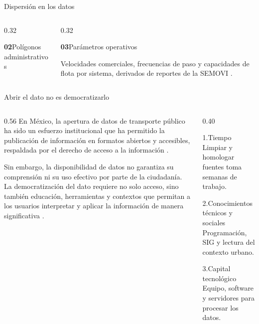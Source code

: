 \begin{frame}[t]{Dispersión en los datos}
\begin{columns}[T]
\begin{column}{0.32\textwidth}
\begin{block}{\parbox[c][1.4em][c]{\linewidth}{\small\textbf{02}\enspace Polígonos administrativos}}
      \end{block}
    \end{column}
    \begin{column}{0.32\textwidth}
      \begin{block}{\parbox[c][1.4em][c]{\linewidth}{\small\textbf{03}\enspace Parámetros operativos}}
        \begin{minipage}[t][3.0cm][t]{\linewidth}\scriptsize
          Velocidades comerciales, frecuencias de paso y capacidades de flota por sistema,
          derivados de reportes de la SEMOVI \citeyearpar{semovi2020diagnostico}.
        \end{minipage}
      \end{block}
    \end{column}
  \end{columns}
\end{frame}


\begin{frame}{Abrir el dato no es democratizarlo}
  \begin{columns}[T]
    \begin{column}{0.56\textwidth}
      \small
      En México, la apertura de datos de transporte público ha sido un esfuerzo institucional
      que ha permitido la publicación de información en formatos abiertos y accesibles,
      respaldada por el derecho de acceso a la información \citep{cpeum_art6}.   %

      \vspace{0.2cm}
      Sin embargo, la disponibilidad de datos no garantiza su comprensión ni su uso efectivo
      por parte de la ciudadanía. La democratización del dato requiere no solo acceso, sino también
      educación, herramientas y contextos que permitan a los usuarios interpretar y aplicar
      la información de manera significativa \citep{gurstein2011open}.
    \end{column}
    \begin{column}{0.40\textwidth}
      \begin{exampleblock}{\footnotesize 1.\enspace Tiempo}
        \scriptsize Limpiar y homologar fuentes toma semanas de trabajo.
      \end{exampleblock}
      \begin{block}{\footnotesize 2.\enspace Conocimientos técnicos y sociales}
        \scriptsize Programación, SIG y lectura del contexto urbano.
      \end{block}
      \begin{alertblock}{\footnotesize 3.\enspace Capital tecnológico}
        \scriptsize Equipo, software y servidores para procesar los datos.
      \end{alertblock}
    \end{column}
  \end{columns}
\end{frame}
